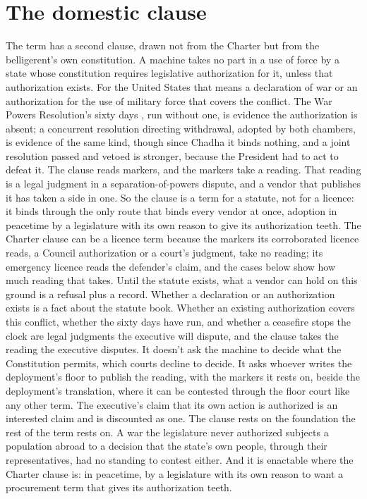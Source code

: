 \section{The domestic clause}
\label{sec:6.5}
The term has a second clause, drawn not from the Charter but from the belligerent's own constitution. A machine takes no part in a use of force by a state whose constitution requires legislative authorization for it, unless that authorization exists. For the United States that means a declaration of war or an authorization for the use of military force that covers the conflict. The War Powers Resolution's sixty days \autocite{wpr1973}, run without one, is evidence the authorization is absent; a concurrent resolution directing withdrawal, adopted by both chambers, is evidence of the same kind, though since Chadha it binds nothing, and a joint resolution passed and vetoed is stronger, because the President had to act to defeat it. The clause reads markers, and the markers take a reading. That reading is a legal judgment in a separation-of-powers dispute, and a vendor that publishes it has taken a side in one. So the clause is a term for a statute, not for a licence: it binds through the only route that binds every vendor at once, adoption in peacetime by a legislature with its own reason to give its authorization teeth. The Charter clause can be a licence term because the markers its corroborated licence reads, a Council authorization or a court's judgment, take no reading; its emergency licence reads the defender's claim, and the cases below show how much reading that takes. Until the statute exists, what a vendor can hold on this ground is a refusal plus a record. Whether a declaration or an authorization exists is a fact about the statute book. Whether an existing authorization covers this conflict, whether the sixty days have run, and whether a ceasefire stops the clock are legal judgments the executive will dispute, and the clause takes the reading the executive disputes. It doesn't ask the machine to decide what the Constitution permits, which courts decline to decide. It asks whoever writes the deployment's floor to publish the reading, with the markers it rests on, beside the deployment's translation, where it can be contested through the floor court like any other term. The executive's claim that its own action is authorized is an interested claim and is discounted as one. The clause rests on the foundation the rest of the term rests on. A war the legislature never authorized subjects a population abroad to a decision that the state's own people, through their representatives, had no standing to contest either. And it is enactable where the Charter clause is: in peacetime, by a legislature with its own reason to want a procurement term that gives its authorization teeth.

